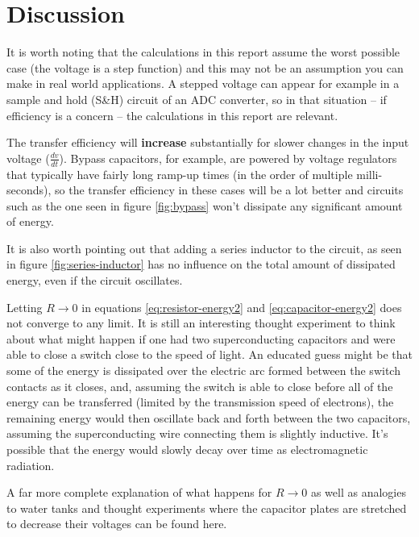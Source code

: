 \section{Discussion}

It  is  worth  noting  that the calculations in this report assume  the  worst
possible  case  (the  voltage is a step function)  and  this  may  not  be  an
assumption  you  can  make  in real world applications. A stepped voltage  can
appear for example in a sample and hold (S\&H) circuit of an ADC converter, so
in that situation -- if efficiency is a concern -- the  calculations  in  this
report are relevant.

The  transfer  efficiency  will  \textbf{increase}  substantially  for  slower
changes  in  the  input  voltage  ($\frac{dv}{dt}$).  Bypass  capacitors,  for
example, are powered by voltage  regulators  that  typically  have fairly long
ramp-up  times  (in  the  order  of  multiple  milli-seconds), so the transfer
efficiency  in  these cases will be a lot better and circuits such as the  one
seen  in  figure \ref{fig:bypass} won't dissipate any  significant  amount  of
energy.

It is also worth pointing out that adding a series inductor to the circuit, as
seen in figure \ref{fig:series-inductor} has no  influence on the total amount
of dissipated energy, even if the circuit oscillates.

Letting     $R\to    0$    in    equations    \ref{eq:resistor-energy2}    and
\ref{eq:capacitor-energy2} does not converge to  any  limit.  It  is  still an
interesting thought experiment to think about what might happen if one had two
superconducting capacitors and were able to close  a switch close to the speed
of  light. An educated guess might be that some of the  energy  is  dissipated
over  the  electric arc formed between the switch contacts as it closes,  and,
assuming  the  switch  is  able  to  close  before all of the  energy  can  be
transferred (limited by the transmission speed of  electrons),  the  remaining
energy  would  then  oscillate  back  and forth between  the  two  capacitors,
assuming the  superconducting wire connecting them is slightly inductive. It's
possible  that  the  energy  would  slowly decay over time as  electromagnetic
radiation.

A  far  more  complete  explanation  of what happens for $R\to 0$ as  well  as
analogies  to  water  tanks and thought experiments where the capacitor plates
are    stretched     to    decrease    their    voltages    can    be    found
here\cite{ref:arXiv:1309.5034}.

